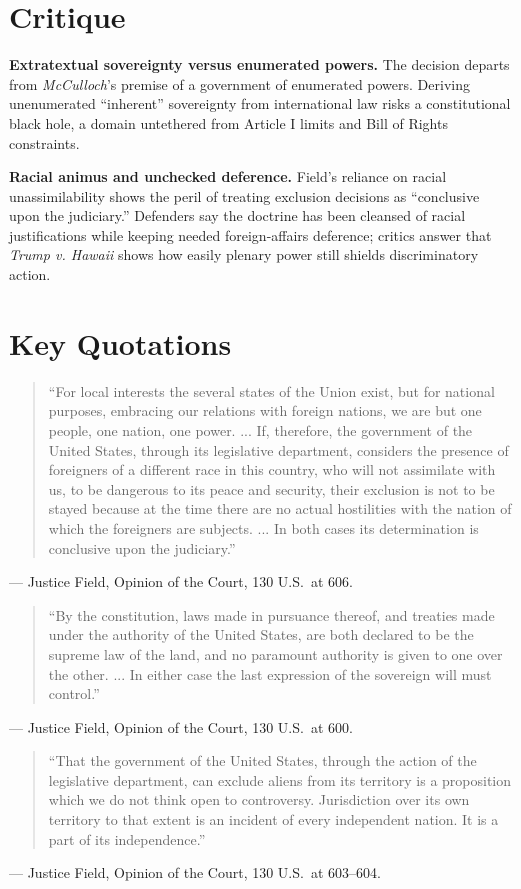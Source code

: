 \documentclass[12pt]{article}
\begin{document}
\section{Critique}

\textbf{Extratextual sovereignty versus enumerated powers.} The decision departs from \textit{McCulloch}'s premise of a government of enumerated powers. Deriving unenumerated ``inherent'' sovereignty from international law risks a constitutional black hole, a domain untethered from Article I limits and Bill of Rights constraints.

\textbf{Racial animus and unchecked deference.} Field's reliance on racial unassimilability shows the peril of treating exclusion decisions as ``conclusive upon the judiciary.'' Defenders say the doctrine has been cleansed of racial justifications while keeping needed foreign-affairs deference; critics answer that \textit{Trump v. Hawaii} shows how easily plenary power still shields discriminatory action.

\section{Key Quotations}

\begin{quote}
``For local interests the several states of the Union exist, but for national purposes, embracing our relations with foreign nations, we are but one people, one nation, one power. ... If, therefore, the government of the United States, through its legislative department, considers the presence of foreigners of a different race in this country, who will not assimilate with us, to be dangerous to its peace and security, their exclusion is not to be stayed because at the time there are no actual hostilities with the nation of which the foreigners are subjects. ... In both cases its determination is conclusive upon the judiciary.''
\end{quote}
\noindent --- Justice Field, Opinion of the Court, 130 U.S.\ at 606.

\begin{quote}
``By the constitution, laws made in pursuance thereof, and treaties made under the authority of the United States, are both declared to be the supreme law of the land, and no paramount authority is given to one over the other. ... In either case the last expression of the sovereign will must control.''
\end{quote}
\noindent --- Justice Field, Opinion of the Court, 130 U.S.\ at 600.

\begin{quote}
``That the government of the United States, through the action of the legislative department, can exclude aliens from its territory is a proposition which we do not think open to controversy. Jurisdiction over its own territory to that extent is an incident of every independent nation. It is a part of its independence.''
\end{quote}
\noindent --- Justice Field, Opinion of the Court, 130 U.S.\ at 603--604.
\end{document}

